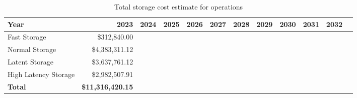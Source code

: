 \tiny \begin{longtable} { |p{}  |r  |r  |r  |r  |r  |r  |r  |r  |r  |r  |r |} 
\caption{Total storage cost estimate for operations \label{tab:opsStorageCost}}\\ 
\hline 
\textbf{Year}&\textbf{2023}&\textbf{2024}&\textbf{2025}&\textbf{2026}&\textbf{2027}&\textbf{2028}&\textbf{2029}&\textbf{2030}&\textbf{2031}&\textbf{2032} \\ \hline
{Fast Storage}&{\$312,840.00}&&&&&&&&& \\ \hline
{Normal Storage}&{\$4,383,311.12}&&&&&&&&& \\ \hline
{Latent Storage}&{\$3,637,761.12}&&&&&&&&& \\ \hline
{High Latency Storage}&{\$2,982,507.91}&&&&&&&&& \\ \hline
\textbf{Total}&\textbf{\$11,316,420.15}&&&&&&&&& \\ \hline
\end{longtable} \normalsize
